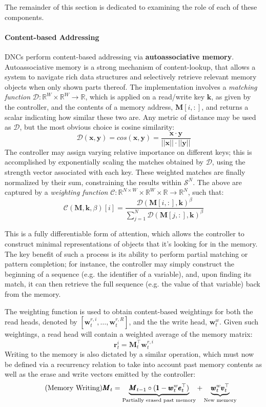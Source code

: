 \documentclass[]{article}
\begin{document}
The remainder of this section is dedicated to examining the role of each of these components.

\paragraph{Content-based Addressing} 
DNCs perform content-based addressing via \textbf{autoassociative memory}. Autoassociative memory is a strong mechanism of content-lookup, that allows a system to navigate rich data structures and selectively retrieve relevant memory objects when only shown parts thereof. The implementation involves a \textit{matching function} $\mathcal{D}: \mathbb{R}^W \times \mathbb{R}^W \to \mathbb{R}$, which is applied on a read/write key $\pmb{k}$, as given by the controller, and the contents of a memory address, $\pmb{M}[i,:]$, and returns a scalar indicating how similar these two are. Any metric of distance may be used as $\mathcal{D}$, but the most obvious choice is cosine similarity:
 \[
 \tag{Cosine Similarity}
\mathcal{D}(\pmb{x}, \pmb{y}) = cos(\pmb{x},\pmb{y}) = \frac{\pmb{x} \cdot \pmb{y}}{||\pmb{x}|| \cdot ||\pmb{y}||}
\]
The controller may assign varying relative importance on different keys; this is accomplished by exponentially scaling the matches obtained by $\mathcal{D}$, using the strength vector associated with each key. These weighted matches are finally normalized by their sum, constraining the results within $\mathcal{S}^N$. The above are captured by a \textit{weighting function} $\mathcal{C}: \mathbb{R}^{N \times W} \times \mathbb{R}^W \times \mathbb{R} \to \mathbb{R}^N$, such that:
\[
\tag{Weighting Function}
\mathcal{C}(\pmb{M},\pmb{k}, \beta)[i] = 
\frac{ \mathcal{D}(\pmb{M}[i,:],\pmb{k})^{\beta} }
{\sum\nolimits_{j=1}^N \mathcal{D}(\pmb{M}[j,:],\pmb{k})^{\beta}}
\]

This is a fully differentiable form of attention, which allows the controller to construct minimal representations of objects that it's looking for in the memory. The key benefit of such a process is its ability to perform partial matching or pattern completion; for instance, the controller may simply construct the beginning of a sequence (e.g. the identifier of a variable), and, upon finding its match, it can then retrieve the full sequence (e.g. the  value of that variable) back from the memory.

The weighting function is used to obtain content-based weightings for both the read heads, denoted by $[\pmb{w}_t^{r,i},\dots,\pmb{w}_t^{r,R}]$, and the the write head, $\pmb{w}_t^w$. Given such weightings, a read head will contain a weighted average of the memory matrix:
\[
\tag{Memory Reading}
\pmb{r}_t^i = \pmb{M}_t^{\top} \pmb{w}_t^{r,i} 
\]
Writing to the memory is also dictated by a similar operation, which must now be defined via a recurrency relation to take into account past memory contents as well as the erase and write vectors emitted by the controller:
\[
\tag{Memory Writing}
\pmb{M}_t = \underbrace{\pmb{M}_{t-1} \circ (\pmb{1} - \pmb{w}_t^w \pmb{e}_t^\top)}_{\text{\scriptsize Partially erased past memory}} + \underbrace{\pmb{w}_t^w \pmb{v}_t^\top}_{\text{\scriptsize New memory}}
\]
\end{document}

